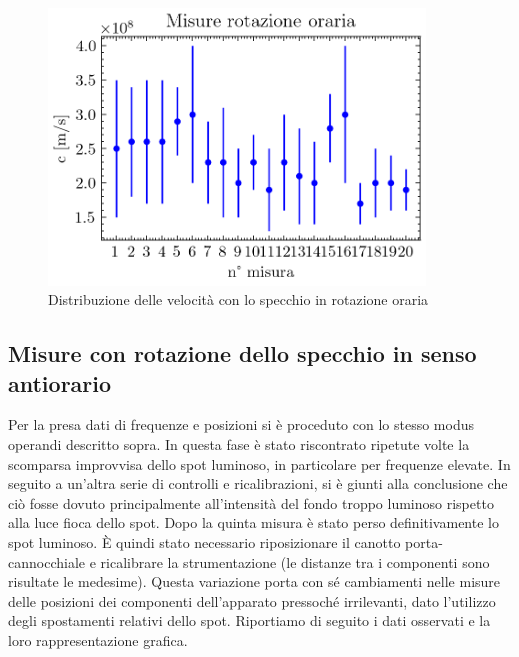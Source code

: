 \documentclass{article}
\begin{document}
            \begin{figure}[H]

                \centering
                \includegraphics[width=10cm]{../images/CW.png}

                \caption{Distribuzione delle velocità con lo specchio in rotazione oraria}
                \label{fig:c_CW}

            \end{figure}
            
            
        \subsection{Misure con rotazione dello specchio in senso antiorario}

            Per la presa dati di frequenze e posizioni si è proceduto con lo stesso modus operandi descritto sopra. 
            In questa fase è stato riscontrato ripetute volte la scomparsa improvvisa dello spot luminoso, in particolare per frequenze elevate. 
            In seguito a un'altra serie di controlli e ricalibrazioni, si è giunti alla conclusione che ciò fosse dovuto principalmente all'intensità del fondo 
            troppo luminoso rispetto alla luce fioca dello spot. 
            Dopo la quinta misura è stato perso definitivamente lo spot luminoso. È quindi stato necessario riposizionare il canotto porta-cannocchiale e 
            ricalibrare la strumentazione (le distanze tra i componenti sono risultate le medesime).
            Questa variazione porta con sé cambiamenti nelle misure delle posizioni dei componenti dell'apparato pressoché irrilevanti, dato l'utilizzo degli spostamenti relativi dello spot.
            Riportiamo di seguito i dati osservati e la loro rappresentazione grafica.   
\end{document}
